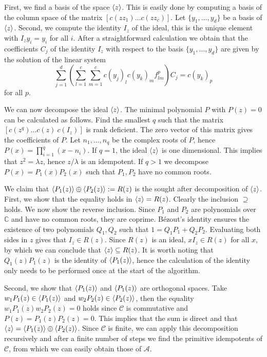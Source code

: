 \documentclass[12 pt]{article}
\begin{document}
First, we find a basis of the space $\braket{z}$. This is easily done by computing a basis of the column space of the matrix $[c(zz_1) \dots c(zz_c)]$. Let $\{y_1,\ldots, y_d\}$ be a basis of $\braket{z}$. Second, we compute the identity $I_z$ of the ideal, this is the unique element with $I_{z}y_i=y_i$ for all $i$. After a straightforward calculation we obtain that the coefficients $C_j$ of the identity $I_z$ with respect to the basis $\{y_1,\dots,y_d\}$ are given by the solution of the linear system
$$
    \sum_{j=1}^d\left(\sum_{l=1}^c\sum_{m=1}^cc(y_j)_lc(y_k)_m f_{lm}^p\right)C_j = c(y_k)_p
$$
for all $p$.

We can now decompose the ideal $\braket{z}$. The minimal polynomial $P$ with $P(z)=0$ can be calculated as follows. Find the smallest $q$ such that the matrix $[c(z^q) \dots c(z)\: c(I_z)]$ is rank deficient. The zero vector of this matrix gives the coefficients of $P$. Let $n_1,\ldots,n_q$ be the complex roots of $P$, hence $P(x)=\prod_{i=1}^q (x-n_i)$. If $q=1$, the ideal $\braket{z}$ is one dimensional. This implies that $z^2=\lambda z$, hence $z/\lambda$ is an idempotent. If $q>1$ we decompose $P(x)=P_1(x)P_2(x)$ such that $P_1,P_2$ have no common roots.

We claim that $\braket{P_1(z)}\oplus\braket{P_2(z)}:=R(z)$ is the sought after decomposition of $\braket{z}$.
First, we show that the equality holds in $\braket{z}=R(z)$. Clearly the inclusion $\supseteq$ holds. We now show the reverse inclusion. Since $P_1$ and $P_2$ are polynomials over $\mathbb{C}$ and have no common roots, they are coprime. B\'ezout's identity ensures the existence of two polynomials $Q_1,Q_2$ such that $1=Q_1P_1+Q_2P_2$. Evaluating both sides in $z$ gives that $I_z \in R(z)$. Since $R(z)$ is an ideal, $xI_z \in R(z)$ for all $x$, by which we can conclude that $\braket{z} \subseteq R(z)$. It is worth noting that $Q_1(z)P_1(z)$ is the identity of $\braket{P_1(z)}$, hence the calculation of the identity only needs to be performed once at the start of the algorithm.

Second, we show that $\braket{P_1(z)}$ and $\braket{P_1(z)}$ are orthogonal spaces. Take $w_1P_1(z) \in \braket{P_1(z)}$ and $w_2P_2(z) \in \braket{P_2(z)}$, then the equality $w_1P_1(z)w_2P_2(z)=0$ holds since $\mathcal{C}$ is commutative and $P(z)=P_1(z)P_2(z)=0$. This implies that the sum is direct and that $\braket{z}=\braket{P_1(z)}\oplus\braket{P_2(z)}$. Since $\mathcal{C}$ is finite, we can apply this decomposition recursively and after a finite number of steps we find the primitive idempotents of $\mathcal{C}$, from which we can easily obtain those of $\mathcal{A}$.
\end{document}

